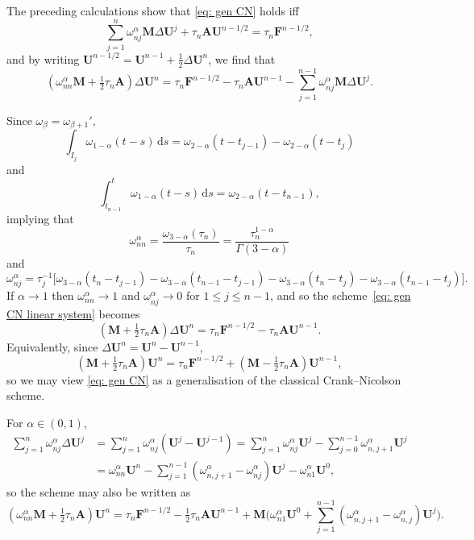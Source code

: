 \documentclass[a4paper,12pt]{article}
\newcommand{\bs}[1]{\boldsymbol{#1}}
\newcommand{\ud}{\mathrm{d}}
\begin{document}
The preceding calculations show that \eqref{eq: gen CN} holds iff
\[
\sum_{j=1}^n\omega_{nj}^\alpha\bs{M}\Delta\bs{U}^j
    +\tau_n\bs{A}\bs{U}^{n-1/2}=\tau_n\bs{F}^{n-1/2},
\]
and by writing $\bs{U}^{n-1/2}=\bs{U}^{n-1}+\tfrac12\Delta\bs{U}^n$, we find
that
\begin{equation}\label{eq: gen CN linear system}
(\omega_{nn}^\alpha\bs{M}+\tfrac12\tau_n\bs{A})\Delta\bs{U}^n
    =\tau_n\bs{F}^{n-1/2}-\tau_n\bs{A}\bs{U}^{n-1}
    -\sum_{j=1}^{n-1}\omega_{nj}^\alpha\bs{M}\Delta\bs{U}^j.
\end{equation}

Since $\omega_\beta=\omega_{\beta+1}'$,
\[
\int_{I_j}\omega_{1-\alpha}(t-s)\,\ud s
    =\omega_{2-\alpha}(t-t_{j-1})-\omega_{2-\alpha}(t-t_j)
\]
and
\[
\int_{t_{n-1}}^t\omega_{1-\alpha}(t-s)\,\ud s=\omega_{2-\alpha}(t-t_{n-1}),
\]
implying that
\[
\omega^\alpha_{nn}=\frac{\omega_{3-\alpha}(\tau_n)}{\tau_n}
    =\frac{\tau_n^{1-\alpha}}{\Gamma(3-\alpha)}
\]
and
\[
\omega^\alpha_{nj}=\tau_j^{-1}\bigl[
\omega_{3-\alpha}(t_n-t_{j-1})-\omega_{3-\alpha}(t_{n-1}-t_{j-1})
-\omega_{3-\alpha}(t_n-t_j)-\omega_{3-\alpha}(t_{n-1}-t_j)\bigr].
\]
If $\alpha\to1$ then $\omega^\alpha_{nn}\to1$ and
$\omega^\alpha_{nj}\to0$ for $1\le j\le n-1$, and so the
scheme~\eqref{eq: gen CN linear system} becomes
\[
(\bs{M}+\tfrac12\tau_n\bs{A})\Delta\bs{U}^n=\tau_n\bs{F}^{n-1/2}
    -\tau_n\bs{A}\bs{U}^{n-1}.
\]
Equivalently, since $\Delta\bs{U}^n=\bs{U}^n-\bs{U}^{n-1}$,
\[
(\bs{M}+\tfrac12\tau_n\bs{A})\bs{U}^n=\tau_n\bs{F}^{n-1/2}
    +(\bs{M}-\tfrac12\tau_n\bs{A})\bs{U}^{n-1},
\]
so we may view \eqref{eq: gen CN} as a generalisation of the classical
Crank--Nicolson scheme.

For $\alpha\in(0,1)$,
\begin{align*}
\sum_{j=1}^n\omega^\alpha_{nj}\Delta\bs{U}^j
    &=\sum_{j=1}^n\omega^\alpha_{nj}(\bs{U}^j-\bs{U}^{j-1})
    =\sum_{j=1}^n\omega^\alpha_{nj}\bs{U}^j
    -\sum_{j=0}^{n-1}\omega^\alpha_{n,j+1}\bs{U}^j\\
    &=\omega^\alpha_{nn}\bs{U}^n
    -\sum_{j=1}^{n-1}(\omega^\alpha_{n,j+1}-\omega^\alpha_{nj})\bs{U}^j
    -\omega^\alpha_{n1}\bs{U}^0,
\end{align*}
so the scheme may also be written as
\[
(\omega^\alpha_{nn}\bs{M}+\tfrac12\tau_n\bs{A})\bs{U}^n
=\tau_n\bs{F}^{n-1/2}-\tfrac12\tau_n\bs{A}\bs{U}^{n-1}
    +\bs{M}\biggl(\omega_{n1}^\alpha\bs{U}^0
    +\sum_{j=1}^{n-1}(\omega^\alpha_{n,j+1}-\omega^\alpha_{n,j})\bs{U}^j\biggr).
\]


\end{document}
